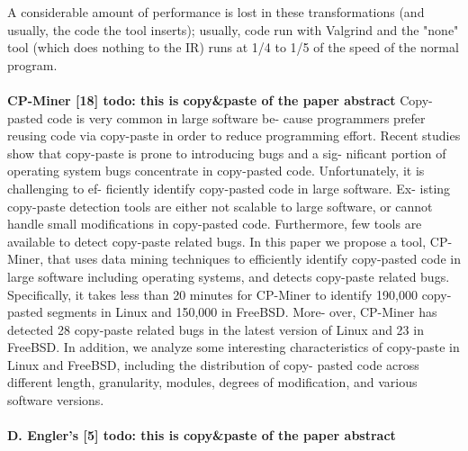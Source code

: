 A considerable amount of performance is lost in these transformations (and usually, the code the tool inserts); usually, code run with Valgrind and the "none" tool (which does nothing to the IR) runs at 1/4 to 1/5 of the speed of the normal program.
\\
\\
\textbf{CP-Miner [18] todo: this is copy\&paste of the paper abstract}
Copy-pasted code is very common in large software be- cause programmers prefer reusing code via copy-paste in order to reduce programming effort. Recent studies show that copy-paste is prone to introducing bugs and a sig- nificant portion of operating system bugs concentrate in copy-pasted code. Unfortunately, it is challenging to ef- ficiently identify copy-pasted code in large software. Ex- isting copy-paste detection tools are either not scalable to large software, or cannot handle small modifications in copy-pasted code. Furthermore, few tools are available to detect copy-paste related bugs.
In this paper we propose a tool, CP-Miner, that uses data mining techniques to efficiently identify copy-pasted code in large software including operating systems, and detects copy-paste related bugs. Specifically, it takes less than 20 minutes for CP-Miner to identify 190,000 copy- pasted segments in Linux and 150,000 in FreeBSD. More- over, CP-Miner has detected 28 copy-paste related bugs in the latest version of Linux and 23 in FreeBSD. In addition, we analyze some interesting characteristics of copy-paste in Linux and FreeBSD, including the distribution of copy- pasted code across different length, granularity, modules, degrees of modification, and various software versions.
\\
\\
\textbf{D. Engler's [5] todo: this is copy\&paste of the paper abstract}
